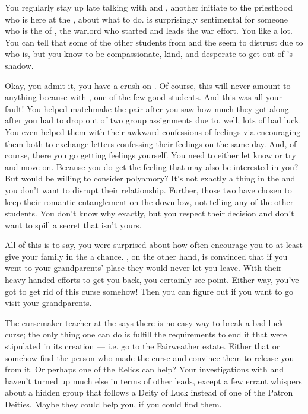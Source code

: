 \documentclass[char]{GL2020}
\begin{document}
You regularly stay up late talking with \cPresident{} and \cWarlordDaughter{\full}, another initiate to the priesthood who is here at the \pSc{}, about what to do. \cWarlordDaughter{} is surprisingly sentimental for someone who is the \cWarlordDaughter{\offspring} of \cLoud{\full}, the warlord who started and leads the \pShip{} war effort. You like \cWarlordDaughter{} a lot. You can tell that some of the other students from \pTech{} and the \pFarm{} seem to distrust \cWarlordDaughter{\them} due to who \cWarlordDaughter{\their} \cLoud{\parent} is, but you know \cWarlordDaughter{} to be compassionate, kind, and desperate to get out of \cWarlordDaughter{\their} \cLoud{\parent}’s shadow. 

Okay, you admit it, you have a crush on \cWarlordDaughter{\them}. Of course, this will never amount to anything because \cWarlordDaughter{\they \are} with \cTechStar{\full}, one of the few good \pTech{} students. And this was all your fault! You helped matchmake the pair after you saw how much they got along after you had to drop out of two group assignments due to, well, lots of bad luck. You even helped them with their awkward confessions of feelings via encouraging them both to exchange letters confessing their feelings on the same day. And, of course, there you go getting feelings yourself. You need to either let \cWarlordDaughter{} know or try and move on. Because you do get the feeling that \cWarlordDaughter{} may also be interested in you? But would \cTechStar{} be willing to consider polyamory? It’s not exactly a thing in the \pTech{} and you don’t want to disrupt their relationship. Further, those two have chosen to keep their romantic entanglement on the down low, not telling any of the other students. You don’t know why exactly, but you respect their decision and don’t want to spill a secret that isn’t yours.

All of this is to say, you were surprised about how \cWarlordDaughter{} often encourage\cWarlordDaughter{\verbs} you to at least give your family in the \pFarm{} a chance.  \cPresident{}, on the other hand, is convinced that if you went to your grandparents' place they would never let you leave. With their heavy handed efforts to get you back, you certainly see \cPresident{\their} point. Either way, you've got to get rid of this curse somehow! Then you can figure out if you want to go visit your grandparents.

The cursemaker teacher at the \pSchool{} says there is no easy way to break a bad luck curse; the only thing one can do is fulfill the requirements to end it that were stipulated in its creation — i.e. go to the Fairweather estate. Either that or somehow find the person who made the curse and convince them to release you from it. Or perhaps one of the Relics can help? Your investigations with \cPresident{} and \cWarlordDaughter{} haven't turned up much else  in terms of other leads, except a few errant whispers about a hidden group that follows a Deity of Luck instead of one of the Patron Deities. Maybe they could help you, if you could find them.
\end{document}
